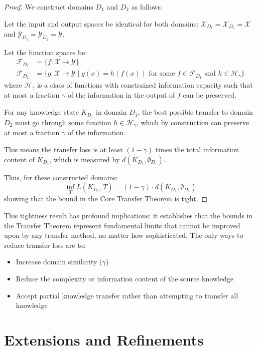 \begin{proof}
We construct domains $D_1$ and $D_2$ as follows:

Let the input and output spaces be identical for both domains: $\mathcal{X}_{D_1} = \mathcal{X}_{D_2} = \mathcal{X}$ and $\mathcal{Y}_{D_1} = \mathcal{Y}_{D_2} = \mathcal{Y}$.

Let the function spaces be:
\begin{align}
\mathcal{F}_{D_1} &= \{f: \mathcal{X} \to \mathcal{Y}\} \\
\mathcal{F}_{D_2} &= \{g: \mathcal{X} \to \mathcal{Y} \mid g(x) = h(f(x)) \text{ for some } f \in \mathcal{F}_{D_1} \text{ and } h \in \mathcal{H}_{\gamma}\}
\end{align}
where $\mathcal{H}_{\gamma}$ is a class of functions with constrained information capacity such that at most a fraction $\gamma$ of the information in the output of $f$ can be preserved.

For any knowledge state $K_{D_1}$ in domain $D_1$, the best possible transfer to domain $D_2$ must go through some function $h \in \mathcal{H}_{\gamma}$, which by construction can preserve at most a fraction $\gamma$ of the information.

This means the transfer loss is at least $(1 - \gamma)$ times the total information content of $K_{D_1}$, which is measured by $d(K_{D_1}, \emptyset_{D_1})$.

Thus, for these constructed domains:
\begin{equation}
\inf_{T} L(K_{D_1}, T) = (1 - \gamma) \cdot d(K_{D_1}, \emptyset_{D_1})
\end{equation}
showing that the bound in the Core Transfer Theorem is tight.
\end{proof}

This tightness result has profound implications: it establishes that the bounds in the Transfer Theorem represent fundamental limits that cannot be improved upon by any transfer method, no matter how sophisticated. The only ways to reduce transfer loss are to:
\begin{itemize}
    \item Increase domain similarity ($\gamma$)
    \item Reduce the complexity or information content of the source knowledge
    \item Accept partial knowledge transfer rather than attempting to transfer all knowledge
\end{itemize}

\section{Extensions and Refinements}

